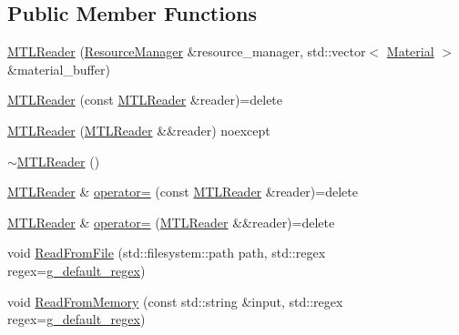 \subsection*{Public Member Functions}
\begin{DoxyCompactItemize}
\item 
\mbox{\hyperlink{classmage_1_1rendering_1_1loader_1_1_m_t_l_reader_a3615f6899de22b53de1bad257ac34099}{M\+T\+L\+Reader}} (\mbox{\hyperlink{classmage_1_1rendering_1_1_resource_manager}{Resource\+Manager}} \&resource\+\_\+manager, std\+::vector$<$ \mbox{\hyperlink{classmage_1_1rendering_1_1_material}{Material}} $>$ \&material\+\_\+buffer)
\item 
\mbox{\hyperlink{classmage_1_1rendering_1_1loader_1_1_m_t_l_reader_ad359e191af9b96e78660ed7aa313a48a}{M\+T\+L\+Reader}} (const \mbox{\hyperlink{classmage_1_1rendering_1_1loader_1_1_m_t_l_reader}{M\+T\+L\+Reader}} \&reader)=delete
\item 
\mbox{\hyperlink{classmage_1_1rendering_1_1loader_1_1_m_t_l_reader_af6b1842f18fb4a6e6bae435fd0f08496}{M\+T\+L\+Reader}} (\mbox{\hyperlink{classmage_1_1rendering_1_1loader_1_1_m_t_l_reader}{M\+T\+L\+Reader}} \&\&reader) noexcept
\item 
\mbox{\hyperlink{classmage_1_1rendering_1_1loader_1_1_m_t_l_reader_a87a4f9bf27cfe8e7e7d0c13c330775d6}{$\sim$\+M\+T\+L\+Reader}} ()
\item 
\mbox{\hyperlink{classmage_1_1rendering_1_1loader_1_1_m_t_l_reader}{M\+T\+L\+Reader}} \& \mbox{\hyperlink{classmage_1_1rendering_1_1loader_1_1_m_t_l_reader_a1153606ce103d9f667726cf5f66a88d1}{operator=}} (const \mbox{\hyperlink{classmage_1_1rendering_1_1loader_1_1_m_t_l_reader}{M\+T\+L\+Reader}} \&reader)=delete
\item 
\mbox{\hyperlink{classmage_1_1rendering_1_1loader_1_1_m_t_l_reader}{M\+T\+L\+Reader}} \& \mbox{\hyperlink{classmage_1_1rendering_1_1loader_1_1_m_t_l_reader_a057f38f1f720e040b2ab5fa08f42fac4}{operator=}} (\mbox{\hyperlink{classmage_1_1rendering_1_1loader_1_1_m_t_l_reader}{M\+T\+L\+Reader}} \&\&reader)=delete
\item 
void \mbox{\hyperlink{classmage_1_1rendering_1_1loader_1_1_m_t_l_reader_ac819910b2ad9cf9751fa223d4f90ada0}{Read\+From\+File}} (std\+::filesystem\+::path path, std\+::regex regex=\mbox{\hyperlink{classmage_1_1_line_reader_a6b21fad06278a64bbdece198844a8cfa}{g\+\_\+default\+\_\+regex}})
\item 
void \mbox{\hyperlink{classmage_1_1rendering_1_1loader_1_1_m_t_l_reader_adc2bf81611774d4a11da47812fcc0f6a}{Read\+From\+Memory}} (const std\+::string \&input, std\+::regex regex=\mbox{\hyperlink{classmage_1_1_line_reader_a6b21fad06278a64bbdece198844a8cfa}{g\+\_\+default\+\_\+regex}})
\end{DoxyCompactItemize}
